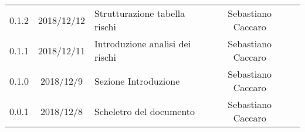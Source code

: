{\begin{longtable}{ c c  C{4cm}  c  c }
		0.1.2 & 2018/12/12 & Strutturazione tabella rischi & Sebastiano Caccaro & \Res{}\\
				
		0.1.1 & 2018/12/11 & Introduzione analisi dei rischi & Sebastiano Caccaro & \Res{}\\
				
		0.1.0 & 2018/12/9 & Sezione Introduzione & Sebastiano Caccaro & \Res{}\\
		
		0.0.1 & 2018/12/8 & Scheletro del documento & Sebastiano Caccaro & \Res{}\\
		
	\end{longtable}

}